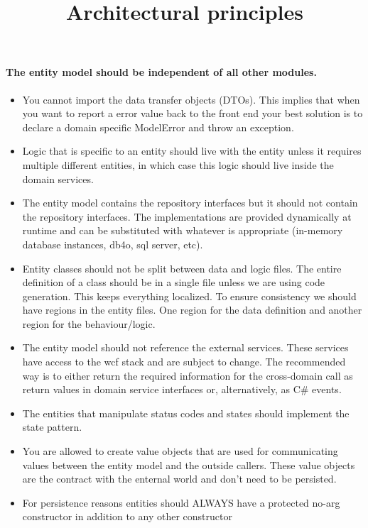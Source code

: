 \documentclass{article}
\begin{document}
\title{Architectural principles}

\paragraph{The entity model should be independent of all other modules.}

\begin{itemize}
  \item You cannot import the data transfer objects (DTOs). This
    implies that when you want to report a error value back to the
    front end your best solution is to declare a domain specific
    ModelError and throw an exception.
  \item Logic that is specific to an entity should live with the
    entity unless it requires multiple different entities, in which
    case this logic should live inside the domain services.
  \item The entity model contains the repository interfaces but it
    should not contain the repository interfaces. The implementations
    are provided dynamically at runtime and can be substituted with
    whatever is appropriate (in-memory database instances, db4o, sql
    server, etc).
  \item Entity classes should not be split between data and logic
    files.  The entire definition of a class should be in a single
    file unless we are using code generation. This keeps everything
    localized. To ensure consistency we should have regions in the
    entity files. One region for the data definition and another
    region for the behaviour/logic.
  \item The entity model should not reference the external services.
    These services have access to the wcf stack and are subject to
    change. The recommended way is to either return the required
    information for the cross-domain call as return values in domain
    service interfaces or, alternatively, as C\# events.
   \item The entities that manipulate status codes and states should
     implement the state pattern.
   \item You are allowed to create value objects that are used for
     communicating values between the entity model and the outside
     callers. These value objects are the contract with the enternal
     world and don't need to be persisted.
   \item For persistence reasons entities should ALWAYS have a
     protected no-arg constructor in addition to any other constructor

\end{itemize}
\end{document}
